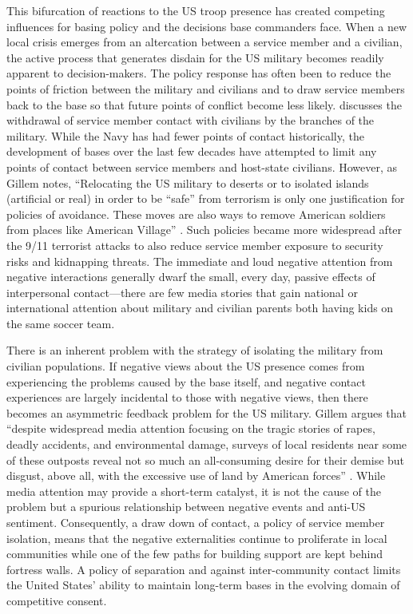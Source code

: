 This bifurcation of reactions to the US troop presence has created competing influences for basing policy and the decisions base commanders face. When a new local crisis emerges from an altercation between a service member and a civilian, the active process that generates disdain for the US military becomes readily apparent to decision-makers. The policy response has often been to reduce the points of friction between the military and civilians and to draw service members back to the base so that future points of conflict become less likely.  discusses the withdrawal of service member contact with civilians by the branches of the military. While the Navy has had fewer points of contact historically, the development of bases over the last few decades have attempted to limit any points of contact between service members and host-state civilians. However, as Gillem notes, ``Relocating the US military to deserts or to isolated islands (artificial or real) in order to be ``safe'' from terrorism is only one justification for policies of avoidance. These moves are also ways to remove American soldiers from places like American Village'' \citeyear[p. 262]{Gillem2007}. Such policies became more widespread after the 9/11 terrorist attacks to also reduce service member exposure to security risks and kidnapping threats. The immediate and loud negative attention from negative interactions generally dwarf the small, every day, passive effects of interpersonal contact---there are few media stories that gain national or international attention about military and civilian parents both having kids on the same soccer team. 


There is an inherent problem with the strategy of isolating the military from civilian populations. If negative views about the US presence comes from experiencing the problems caused by the base itself, and negative contact experiences are largely incidental to those with negative views, then there becomes an asymmetric feedback problem for the US military. Gillem argues that ``despite widespread media attention focusing on the tragic stories of rapes, deadly accidents, and environmental damage, surveys of local residents near some of these outposts reveal not so much an all-consuming desire for their demise but disgust, above all, with the excessive use of land by American forces'' \citeyear[p. xv]{Gillem2007}. While media attention may provide a short-term catalyst, it is not the cause of the problem but a spurious relationship between negative events and anti-US sentiment. Consequently, a draw down of contact, a policy of service member isolation, means that the negative externalities continue to proliferate in local communities while one of the few paths for building support are kept behind fortress walls. A policy of separation and against inter-community contact limits the United States' ability to maintain long-term bases in the evolving domain of competitive consent.


